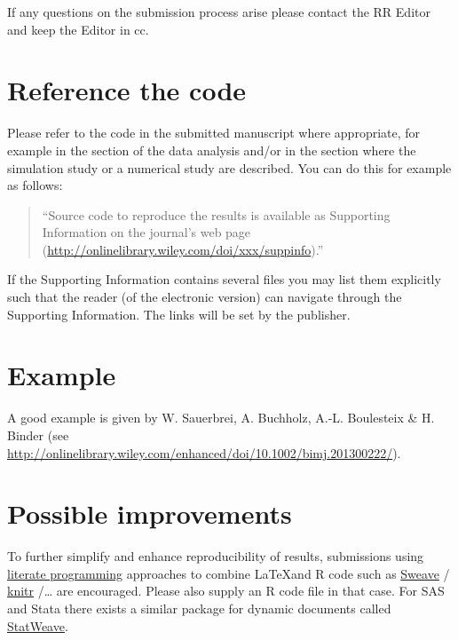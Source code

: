 \documentclass[12pt,a4paper]{article}
\begin{document}
If any questions on the submission process arise please contact the RR Editor
and keep the Editor in cc.


\section{Reference the code}

Please refer to the code in the submitted manuscript where appropriate, for
example in the section of the data analysis and/or in the section where the
simulation study or a numerical study are described. You can do this for example
as follows:
\begin{quote}
  ``Source code to reproduce the results is available as Supporting Information
  on the journal's web page (\url{http://onlinelibrary.wiley.com/doi/xxx/suppinfo}).''
\end{quote}

If the Supporting Information contains several files you may list them
explicitly such that the reader (of the electronic version) can navigate through
the Supporting Information. The links will be set by the publisher.

\section{Example}

A good example is given by W. Sauerbrei, A. Buchholz, A.-L. Boulesteix \& H.
Binder (see \url{http://onlinelibrary.wiley.com/enhanced/doi/10.1002/bimj.201300222/}).


\section{Possible improvements}

To further simplify and enhance reproducibility of results, submissions using
\href{http://en.wikipedia.org/wiki/Literate_Programming}{literate programming}
approaches to combine \LaTeX and \textsf{R} code such as
\href{http://en.wikipedia.org/wiki/Sweave}{Sweave}
\citep{Leisch:2002,Leisch:2003}/
\href{http://en.wikipedia.org/wiki/Knitr}{knitr} \citep{Xie:2013,Xie:2014}/\ldots
are encouraged. Please also supply an \textsf{R} code file in that case. For
\textsf{SAS} and \textsf{Stata} there exists a similar package for dynamic
documents called
\href{http://homepage.stat.uiowa.edu/~rlenth/StatWeave/}{StatWeave}.
\end{document}
